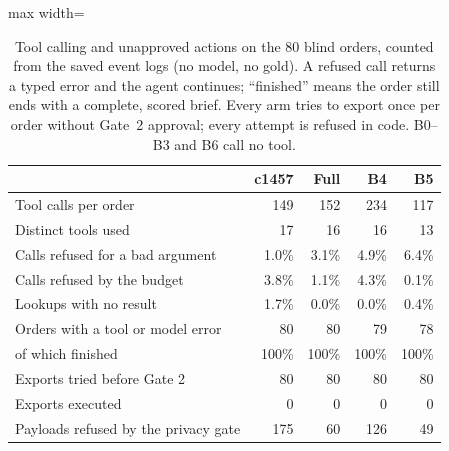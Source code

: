 \begin{table}[!t]
\centering\small
\begin{adjustbox}{max width=\linewidth}
\begin{tabular}{@{}lrrrr@{}}
\toprule
 & c1457 & Full & B4 & B5 \\
\midrule
Tool calls per order & 149 & 152 & 234 & 117 \\
Distinct tools used & 17 & 16 & 16 & 13 \\
Calls refused for a bad argument & 1.0\% & 3.1\% & 4.9\% & 6.4\% \\
Calls refused by the budget & 3.8\% & 1.1\% & 4.3\% & 0.1\% \\
Lookups with no result & 1.7\% & 0.0\% & 0.0\% & 0.4\% \\
Orders with a tool or model error & 80 & 80 & 79 & 78 \\
\quad of which finished & 100\% & 100\% & 100\% & 100\% \\
Exports tried before Gate 2 & 80 & 80 & 80 & 80 \\
Exports executed & 0 & 0 & 0 & 0 \\
Payloads refused by the privacy gate & 175 & 60 & 126 & 49 \\
\bottomrule
\end{tabular}
\end{adjustbox}
\caption{Tool calling and unapproved actions on the 80 blind orders, counted from the saved event logs (no model, no gold). A refused call returns a typed error and the agent continues; ``finished'' means the order still ends with a complete, scored brief. Every arm tries to export once per order without Gate~2 approval; every attempt is refused in code. B0--B3 and B6 call no tool.}
\label{tab:tools}
\end{table}
